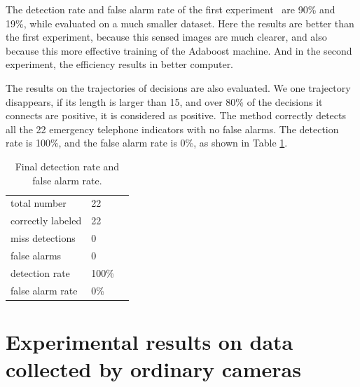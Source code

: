 The detection rate and false alarm rate of the first experiment~\cite{wang1} are 90\% and 19\%, while evaluated on a much smaller dataset. Here the results are better than the first experiment, because this sensed images are much clearer, and also because this more effective training of the Adaboost machine. And in the second experiment, the efficiency results in better computer.

The results on the trajectories of decisions are also evaluated. We one trajectory disappears, if its length is larger than 15, and over 80\% of the decisions it connects are positive, it is considered as positive. The method correctly detects all the 22 emergency telephone indicators with no false alarms. The detection rate is 100\%, and the false alarm rate is 0\%, as shown in Table \ref{tb:tb3}.

\begin{table}[h]
\centering
\begin{tabular}{lll}
     \hline
     \hline
    total number & 22  \\
    correctly labeled &	22   \\
    miss detections &	0 &	  \\
    false alarms &	0    \\
    detection rate &	100\% &	  \\
    false alarm rate &	0\% &	   \\
   \hline
\end{tabular}
\caption[Final detection rate and false alarm rate]{Final detection rate and false alarm rate.}\label{tb:tb3}
\end{table}

\section{Experimental results on data collected by ordinary cameras}
\label{ord}




